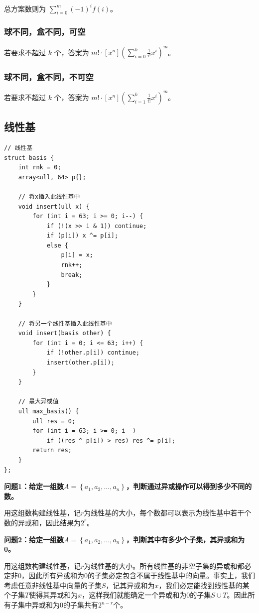 \documentclass[UTF8, twoside]{ctexart}
\begin{document}
\begin{sloppypar}
总方案数则为 $\sum\limits_{i=0}^{m}(-1)^if(i)$。

\subsubsection{球不同，盒不同，可空}

若要求不超过  $k$ 个，答案为 $m!\cdot[x^n]\left(\sum\limits_{i=0}^k\frac{1}{i!}x^i\right)^m$。

\subsubsection{球不同，盒不同，不可空}

若要求不超过  $k$ 个，答案为 $m!\cdot[x^n]\left(\sum\limits_{i=1}^k\frac{1}{i!}x^i\right)^m$。


\subsection{线性基}

\begin{lstlisting}[style=cpp]
// 线性基
struct basis {
    int rnk = 0;
    array<ull, 64> p{};

    // 将x插入此线性基中
    void insert(ull x) {
        for (int i = 63; i >= 0; i--) {
            if (!(x >> i & 1)) continue;
            if (p[i]) x ^= p[i];
            else {
                p[i] = x;
                rnk++;
                break;
            }
        }
    }

    // 将另一个线性基插入此线性基中
    void insert(basis other) {
        for (int i = 0; i <= 63; i++) {
            if (!other.p[i]) continue;
            insert(other.p[i]);
        }
    }

    // 最大异或值
    ull max_basis() {
        ull res = 0;
        for (int i = 63; i >= 0; i--)
            if ((res ^ p[i]) > res) res ^= p[i];
        return res;
    }
};
\end{lstlisting}

\textbf{问题1：给定一组数$A=\left\{a_1,a_2,\ldots,a_n\right\}$，判断通过异或操作可以得到多少不同的数。}

用这组数构建线性基，记$r$为线性基的大小，每个数都可以表示为线性基中若干个数的异或和，因此结果为$2^r$。

\textbf{问题2：给定一组数$A=\left\{a_1,a_2,\ldots,a_n\right\}$，判断其中有多少个子集，其异或和为0。}

用这组数构建线性基，记$r$为线性基的大小。所有线性基的非空子集的异或和都必定非0，因此所有异或和为0的子集必定包含不属于线性基中的向量。事实上，我们考虑任意非线性基中向量的子集$S$，记其异或和为$x$，我们必定能找到线性基的某个子集$T$使得其异或和为$x$，这样我们就能确定一个异或和为0的子集$S\cup T$。因此所有子集中异或和为0的子集共有$2^{n-r}$个。


\end{sloppypar}
\end{document}
